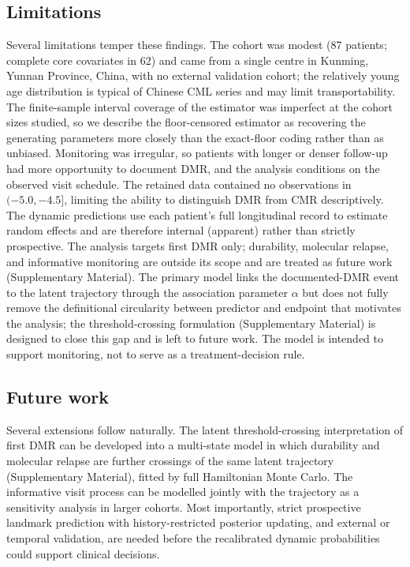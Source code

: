 \documentclass[11pt]{article}
\begin{document}
\subsection{Limitations}

Several limitations temper these findings. The cohort was modest (87
patients; complete core covariates in 62) and came from a single centre in
Kunming, Yunnan Province, China, with no external validation cohort; the
relatively young age distribution is typical of Chinese CML series and may
limit transportability. The finite-sample interval coverage of the estimator
was imperfect at the cohort sizes studied, so we describe the floor-censored
estimator as recovering the generating parameters more closely than the
exact-floor coding rather than as unbiased. Monitoring was irregular, so
patients with longer or denser follow-up had more opportunity to document
DMR, and the analysis conditions on the observed visit schedule. The
retained data contained no observations in $(-5.0,-4.5]$, limiting the
ability to distinguish DMR from CMR descriptively. The dynamic predictions
use each patient's full longitudinal record to estimate random effects and
are therefore internal (apparent) rather than strictly prospective. The
analysis targets first DMR only; durability, molecular relapse, and
informative monitoring are outside its scope and are treated as future work
(Supplementary Material). The primary model links the documented-DMR event to
the latent trajectory through the association parameter $\alpha$ but does not
fully remove the definitional circularity between predictor and endpoint that
motivates the analysis; the threshold-crossing formulation (Supplementary
Material) is designed to close this gap and is left to future work. The model
is intended to support monitoring, not to serve as a treatment-decision
rule.

\subsection{Future work}

Several extensions follow naturally. The latent threshold-crossing
interpretation of first DMR can be developed into a multi-state model in
which durability and molecular relapse are further crossings of the same
latent trajectory (Supplementary Material), fitted by full Hamiltonian Monte
Carlo. The informative visit process can be modelled jointly with the
trajectory as a sensitivity analysis in larger cohorts. Most importantly,
strict prospective landmark prediction with history-restricted posterior
updating, and external or temporal validation, are needed before the
recalibrated dynamic probabilities could support clinical decisions.
\end{document}
